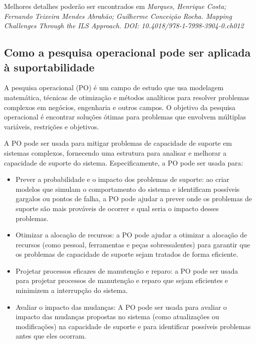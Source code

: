 \documentclass{amsart}
\begin{document}
Melhores detalhes poderão ser encontrados em {\it Marques, Henrique Costa; Fernando Teixeira Mendes Abrahão; Guilherme Conceição Rocha. Mapping Challenges Through the ILS Approach. DOI: 10.4018/978-1-7998-3904-0.ch012}

\subsection{Como a pesquisa operacional pode ser aplicada à suportabilidade}

A pesquisa operacional (PO) é um campo de estudo que usa modelagem matemática, técnicas de otimização e métodos analíticos para resolver problemas complexos em negócios, engenharia e outros campos. O objetivo da pesquisa operacional é encontrar soluções ótimas para problemas que envolvem múltiplas variáveis, restrições e objetivos.

A PO pode ser usada para mitigar problemas de capacidade de suporte em sistemas complexos, fornecendo uma estrutura para analisar e melhorar a capacidade de suporte do sistema. Especificamente, a PO pode ser usada para:

\begin{itemize}
	
\item Prever a probabilidade e o impacto dos problemas de suporte: ao criar modelos que simulam o comportamento do sistema e identificam possíveis gargalos ou pontos de falha, a PO pode ajudar a prever onde os problemas de suporte são mais prováveis de ocorrer e qual seria o impacto desses problemas.

\item Otimizar a alocação de recursos: a PO pode ajudar a otimizar a alocação de recursos (como pessoal, ferramentas e peças sobressalentes) para garantir que os problemas de capacidade de suporte sejam tratados de forma eficiente.

\item Projetar processos eficazes de manutenção e reparo: a PO pode ser usada para projetar processos de manutenção e reparo que sejam eficientes e minimizem a interrupção do sistema.

\item Avaliar o impacto das mudanças: A PO pode ser usada para avaliar o impacto das mudanças propostas no sistema (como atualizações ou modificações) na capacidade de suporte e para identificar possíveis problemas antes que eles ocorram.

\end{itemize}
\end{document}
